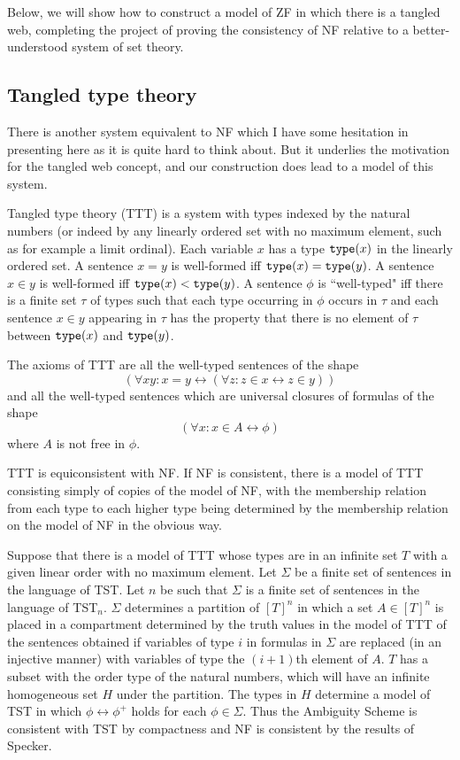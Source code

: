 \documentclass[12pt]{article}
\begin{document}
Below, we will show how to construct a model of ZF in which there is a tangled web, completing the project of proving the consistency of NF relative to a better-understood system of set theory.

\subsection{Tangled type theory}

There is another system equivalent to NF which I have some hesitation in presenting here as it is quite hard to think about.  But it underlies the motivation for the tangled web concept, and our construction does lead to a model of this system.

Tangled type theory (TTT) is a system with types indexed by the natural numbers (or indeed by any linearly ordered set with no maximum element, such as for example a limit ordinal).
Each variable $x$ has a type ${\tt type}(x)$ in the linearly ordered set.  A sentence $x=y$ is well-formed iff ${\tt type}(x)={\tt type}(y)$.  A sentence $x \in y$ is well-formed
iff ${\tt type}(x) < {\tt type}(y)$.  A sentence $\phi$ is ``well-typed" iff there is a finite set $\tau$  of types such that each type occurring in $\phi$ occurs in $\tau$ and
each sentence $x \in y$ appearing in $\tau$ has the property that there is no element of $\tau$ between ${\tt type}(x)$ and ${\tt type}(y)$.

The axioms of TTT are all the well-typed sentences of the shape $$(\forall xy:x=y \leftrightarrow (\forall z:z \in x \leftrightarrow z \in y))$$ and all the well-typed sentences which are universal closures of formulas of the shape $$(\forall x:x \in A \leftrightarrow \phi)$$  where $A$ is not free in $\phi$.

TTT is equiconsistent with NF.  If NF is consistent, there is a model of TTT consisting simply of copies of the model of NF, with the membership relation from each type to each higher type being determined by the membership relation on the model of NF in the obvious way.

Suppose that  there is a model of TTT whose types are in an infinite set $T$ with a given linear order with no maximum element.   Let $\Sigma$ be a finite set of sentences in the language of TST.  Let $n$ be such that $\Sigma$ is a finite set of sentences in the language of TST$_n$.  $\Sigma$ determines a partition of $[T]^n$ in which a set $A \in [T]^n$ is placed  in a compartment determined by the truth values in the model of TTT of the sentences obtained if variables of type $i$  in formulas in $\Sigma$ are replaced (in an injective manner) with variables of type the $(i+1)$th element of $A$.  $T$ has a subset with the order type of the natural numbers, which will have an infinite homogeneous set $H$ under the partition.  The types in $H$ determine a model of TST in which $\phi \leftrightarrow \phi^+$ holds for each $\phi \in \Sigma$.  Thus the Ambiguity Scheme is consistent with TST by compactness and NF is consistent by the results of Specker.
\end{document}
